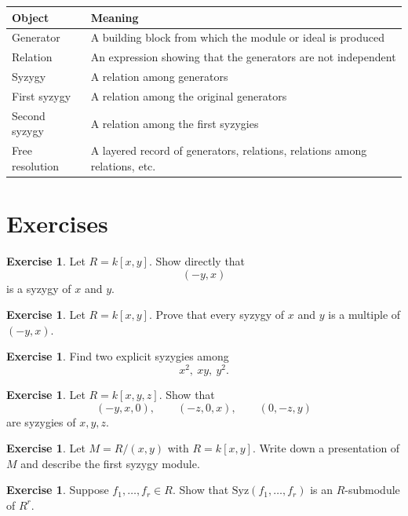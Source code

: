 \documentclass[11pt]{article}
\theoremstyle{definition}
\newtheorem{exercise}[theorem]{Exercise}
\theoremstyle{remark}
\newcommand{\Syz}{\mathrm{Syz}}
\begin{document}
	\begin{center}
		\begin{tabular}{>{\raggedright\arraybackslash}p{} >{\raggedright\arraybackslash}p{}}
			\textbf{Object} & \textbf{Meaning} \\
			\hline
			Generator & A building block from which the module or ideal is produced \\
			Relation & An expression showing that the generators are not independent \\
			Syzygy & A relation among generators \\
			First syzygy & A relation among the original generators \\
			Second syzygy & A relation among the first syzygies \\
			Free resolution & A layered record of generators, relations, relations among relations, etc.
		\end{tabular}
	\end{center}
	
	\section{Exercises}
	
	\begin{exercise}
		Let \(R=k[x,y]\). Show directly that
		\[
		(-y,x)
		\]
		is a syzygy of \(x\) and \(y\).
	\end{exercise}
	
	\begin{exercise}
		Let \(R=k[x,y]\). Prove that every syzygy of \(x\) and \(y\) is a multiple of \((-y,x)\).
	\end{exercise}
	
	\begin{exercise}
		Find two explicit syzygies among
		\[
		x^2,\ xy,\ y^2.
		\]
	\end{exercise}
	
	\begin{exercise}
		Let \(R=k[x,y,z]\). Show that
		\[
		(-y,x,0),\qquad (-z,0,x),\qquad (0,-z,y)
		\]
		are syzygies of \(x,y,z\).
	\end{exercise}
	
	\begin{exercise}
		Let \(M=R/(x,y)\) with \(R=k[x,y]\). Write down a presentation of \(M\) and describe the first syzygy module.
	\end{exercise}
	
	\begin{exercise}
		Suppose \(f_1,\dots,f_r\in R\). Show that \(\Syz(f_1,\dots,f_r)\) is an \(R\)-submodule of \(R^r\).
	\end{exercise}
	
\end{document}

